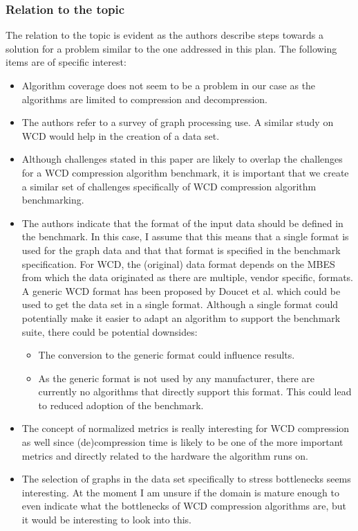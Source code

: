 \subsubsection{Relation to the topic}
The relation to the topic is evident as the authors describe steps towards a solution for a problem similar to the one addressed in this plan. The following items are of specific interest:
\begin{itemize}
\item Algorithm coverage does not seem to be a problem in our case as the algorithms are limited to compression and decompression. 
\item The authors refer to a survey of graph processing use. A similar study on WCD would help in the creation of a data set.
\item Although challenges stated in this paper are likely to overlap the challenges for a WCD compression algorithm benchmark, it is important that we create a similar set of challenges specifically of WCD compression algorithm benchmarking.
\item The authors indicate that the format of the input data should be defined in the benchmark. In this case, I assume that this means that a single format is used for the graph data and that that format is specified in the benchmark specification. For WCD, the (original) data format depends on the MBES from which the data originated as there are multiple, vendor specific, formats. A generic WCD format has been proposed by Doucet et al.\cite{doucet2009advanced} which could be used to get the data set in a single format. Although a single format could potentially make it easier to adapt an algorithm to support the benchmark suite, there could be potential downsides:
\begin{itemize}
\item The conversion to the generic format could influence results.
\item As the generic format is not used by any manufacturer, there are currently no algorithms that directly support this format. This could lead to reduced adoption of the benchmark.
\end{itemize}
\item The concept of normalized metrics is really interesting for WCD compression as well since (de)compression time is likely to be one of the more important metrics and directly related to the hardware the algorithm runs on.
\item The selection of graphs in the data set specifically to stress bottlenecks seems interesting. At the moment I am unsure if the domain is mature enough to even indicate what the bottlenecks of WCD compression algorithms are, but it would be interesting to look into this.

\end{itemize}

